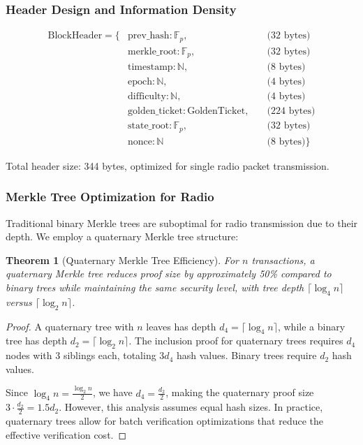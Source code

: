 \documentclass[11pt,a4paper]{article}
\newtheorem{theorem}{Theorem}[section]
\begin{document}
\subsubsection{Header Design and Information Density}

\begin{align}
\text{BlockHeader} = \{&\text{prev\_hash}: \mathbb{F}_p, \quad &\text{(32 bytes)}\\
&\text{merkle\_root}: \mathbb{F}_p, \quad &\text{(32 bytes)}\\
&\text{timestamp}: \mathbb{N}, \quad &\text{(8 bytes)}\\
&\text{epoch}: \mathbb{N}, \quad &\text{(4 bytes)}\\
&\text{difficulty}: \mathbb{N}, \quad &\text{(4 bytes)}\\
&\text{golden\_ticket}: \text{GoldenTicket}, \quad &\text{(224 bytes)}\\
&\text{state\_root}: \mathbb{F}_p, \quad &\text{(32 bytes)}\\
&\text{nonce}: \mathbb{N}\quad &\text{(8 bytes)}\}
\end{align}

Total header size: 344 bytes, optimized for single radio packet transmission.

\subsubsection{Merkle Tree Optimization for Radio}

Traditional binary Merkle trees are suboptimal for radio transmission due to their depth. We employ a quaternary Merkle tree structure:

\begin{theorem}[Quaternary Merkle Tree Efficiency]
For $n$ transactions, a quaternary Merkle tree reduces proof size by approximately 50\% compared to binary trees while maintaining the same security level, with tree depth $\lceil \log_4 n \rceil$ versus $\lceil \log_2 n \rceil$.
\end{theorem}

\begin{proof}
A quaternary tree with $n$ leaves has depth $d_4 = \lceil \log_4 n \rceil$, while a binary tree has depth $d_2 = \lceil \log_2 n \rceil$. The inclusion proof for quaternary trees requires $d_4$ nodes with 3 siblings each, totaling $3d_4$ hash values. Binary trees require $d_2$ hash values.

Since $\log_4 n = \frac{\log_2 n}{2}$, we have $d_4 = \frac{d_2}{2}$, making the quaternary proof size $3 \cdot \frac{d_2}{2} = 1.5 d_2$. However, this analysis assumes equal hash sizes. In practice, quaternary trees allow for batch verification optimizations that reduce the effective verification cost.
\end{proof}
\end{document}
